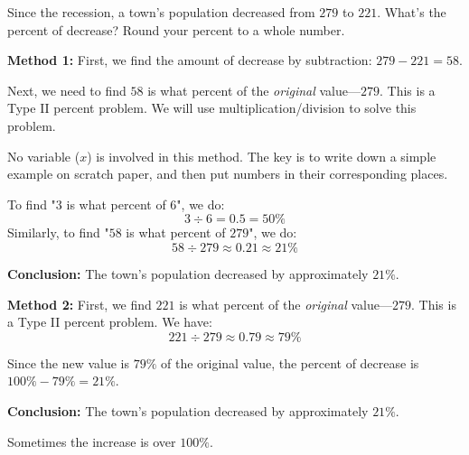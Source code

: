 \begin{myexample}
Since the recession, a town's population decreased from $279$ to $221$. What's the percent of decrease? Round your percent to a whole number.
\end{myexample}
\begin{solution}

\textbf{Method 1:} First, we find the amount of decrease by subtraction: $279-221=58$.

Next, we need to find $58$ is what percent of the \textit{original} value---$279$. This is a Type II percent problem. We will use multiplication/division to solve this problem.

No variable ($x$) is involved in this method. The key is to write down a simple example on scratch paper, and then put numbers in their corresponding places.

To find "$3$ is what percent of $6$", we do:
\[ 3\div6=0.5=50\% \]
Similarly, to find "$58$ is what percent of $279$", we do:
\[ 58\div279 \approx 0.21 \approx 21\% \]

\textbf{Conclusion: } The town's population decreased by approximately $21\%$.

\textbf{Method 2: } First, we find $221$ is what percent of the \textit{original} value---$279$. This is a Type II percent problem. We have:
\[ 221\div279 \approx 0.79 \approx 79\% \]

Since the new value is $79\%$ of the original value, the percent of decrease is $100\%-79\%=21\%$.

\textbf{Conclusion: } The town's population decreased by approximately $21\%$.

\end{solution}

Sometimes the increase is over $100\%$.

